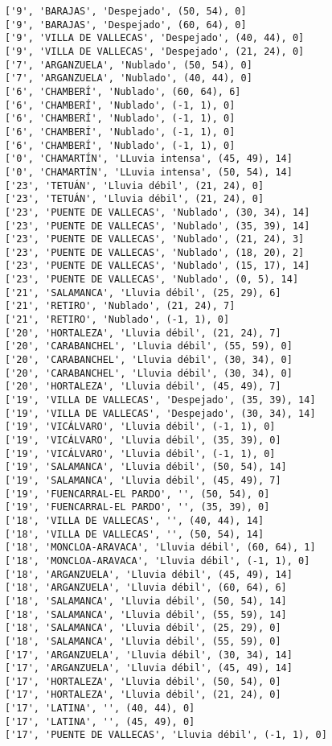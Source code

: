 \documentclass[11pt]{article}
\begin{document}
\begin{Verbatim}[commandchars=\\\{\}]
['9', 'BARAJAS', 'Despejado', (50, 54), 0]
['9', 'BARAJAS', 'Despejado', (60, 64), 0]
['9', 'VILLA DE VALLECAS', 'Despejado', (40, 44), 0]
['9', 'VILLA DE VALLECAS', 'Despejado', (21, 24), 0]
['7', 'ARGANZUELA', 'Nublado', (50, 54), 0]
['7', 'ARGANZUELA', 'Nublado', (40, 44), 0]
['6', 'CHAMBERÍ', 'Nublado', (60, 64), 6]
['6', 'CHAMBERÍ', 'Nublado', (-1, 1), 0]
['6', 'CHAMBERÍ', 'Nublado', (-1, 1), 0]
['6', 'CHAMBERÍ', 'Nublado', (-1, 1), 0]
['6', 'CHAMBERÍ', 'Nublado', (-1, 1), 0]
['0', 'CHAMARTÍN', 'LLuvia intensa', (45, 49), 14]
['0', 'CHAMARTÍN', 'LLuvia intensa', (50, 54), 14]
['23', 'TETUÁN', 'Lluvia débil', (21, 24), 0]
['23', 'TETUÁN', 'Lluvia débil', (21, 24), 0]
['23', 'PUENTE DE VALLECAS', 'Nublado', (30, 34), 14]
['23', 'PUENTE DE VALLECAS', 'Nublado', (35, 39), 14]
['23', 'PUENTE DE VALLECAS', 'Nublado', (21, 24), 3]
['23', 'PUENTE DE VALLECAS', 'Nublado', (18, 20), 2]
['23', 'PUENTE DE VALLECAS', 'Nublado', (15, 17), 14]
['23', 'PUENTE DE VALLECAS', 'Nublado', (0, 5), 14]
['21', 'SALAMANCA', 'Lluvia débil', (25, 29), 6]
['21', 'RETIRO', 'Nublado', (21, 24), 7]
['21', 'RETIRO', 'Nublado', (-1, 1), 0]
['20', 'HORTALEZA', 'Lluvia débil', (21, 24), 7]
['20', 'CARABANCHEL', 'Lluvia débil', (55, 59), 0]
['20', 'CARABANCHEL', 'Lluvia débil', (30, 34), 0]
['20', 'CARABANCHEL', 'Lluvia débil', (30, 34), 0]
['20', 'HORTALEZA', 'Lluvia débil', (45, 49), 7]
['19', 'VILLA DE VALLECAS', 'Despejado', (35, 39), 14]
['19', 'VILLA DE VALLECAS', 'Despejado', (30, 34), 14]
['19', 'VICÁLVARO', 'Lluvia débil', (-1, 1), 0]
['19', 'VICÁLVARO', 'Lluvia débil', (35, 39), 0]
['19', 'VICÁLVARO', 'Lluvia débil', (-1, 1), 0]
['19', 'SALAMANCA', 'Lluvia débil', (50, 54), 14]
['19', 'SALAMANCA', 'Lluvia débil', (45, 49), 7]
['19', 'FUENCARRAL-EL PARDO', '', (50, 54), 0]
['19', 'FUENCARRAL-EL PARDO', '', (35, 39), 0]
['18', 'VILLA DE VALLECAS', '', (40, 44), 14]
['18', 'VILLA DE VALLECAS', '', (50, 54), 14]
['18', 'MONCLOA-ARAVACA', 'Lluvia débil', (60, 64), 1]
['18', 'MONCLOA-ARAVACA', 'Lluvia débil', (-1, 1), 0]
['18', 'ARGANZUELA', 'Lluvia débil', (45, 49), 14]
['18', 'ARGANZUELA', 'Lluvia débil', (60, 64), 6]
['18', 'SALAMANCA', 'Lluvia débil', (50, 54), 14]
['18', 'SALAMANCA', 'Lluvia débil', (55, 59), 14]
['18', 'SALAMANCA', 'Lluvia débil', (25, 29), 0]
['18', 'SALAMANCA', 'Lluvia débil', (55, 59), 0]
['17', 'ARGANZUELA', 'Lluvia débil', (30, 34), 14]
['17', 'ARGANZUELA', 'Lluvia débil', (45, 49), 14]
['17', 'HORTALEZA', 'Lluvia débil', (50, 54), 0]
['17', 'HORTALEZA', 'Lluvia débil', (21, 24), 0]
['17', 'LATINA', '', (40, 44), 0]
['17', 'LATINA', '', (45, 49), 0]
['17', 'PUENTE DE VALLECAS', 'Lluvia débil', (-1, 1), 0]

\end{Verbatim}
\end{document}
